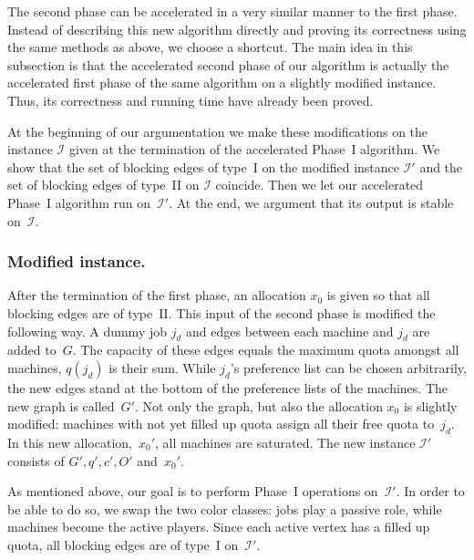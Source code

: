 \documentclass{llncs}
\begin{document}
The second phase can be accelerated in a very similar manner to the first phase. Instead of describing this new algorithm directly and proving its correctness using the same methods as above, we choose a shortcut. The main idea in this subsection is that the accelerated second phase of our algorithm is actually the accelerated first phase of the same algorithm on a slightly modified instance. Thus, its correctness and running time have already been proved.

At the beginning of our argumentation we make these modifications on the instance $\mathcal{I}$ given at the termination of the accelerated Phase~I algorithm. We show that the set of blocking edges of type~I on the modified instance $\mathcal{I}'$ and the set of blocking edges of type~II on $\mathcal{I}$ coincide. Then we let our accelerated Phase~I algorithm run on~$\mathcal{I}'$. At the end, we argument that its output is stable on~$\mathcal{I}$.

\subsubsection*{Modified instance.}

After the termination of the first phase, an allocation $x_0$ is given so that all blocking edges are of type~II. This input of the second phase is modified the following way. A dummy job $j_d$ and edges between each machine and $j_d$ are added to~$G$. The capacity of these edges equals the maximum quota amongst all machines, $q(j_d)$ is their sum. While $j_d$'s preference list can be chosen arbitrarily, the new edges stand at the bottom of the preference lists of the machines. The new graph is called~$G'$. Not only the graph, but also the allocation $x_0$ is slightly modified: machines with not yet filled up quota assign all their free quota to~$j_d$. In this new allocation,~$x_0'$, all machines are saturated. The new instance $\mathcal{I}'$ consists of $G', q', c', O'$ and~$x_0'$.

As mentioned above, our goal is to perform Phase~I operations on~$\mathcal{I}'$. In order to be able to do so, we swap the two color classes: jobs play a passive role, while machines become the active players. Since each active vertex has a filled up quota, all blocking edges are of type~I on~$\mathcal{I}'$.
\end{document}
